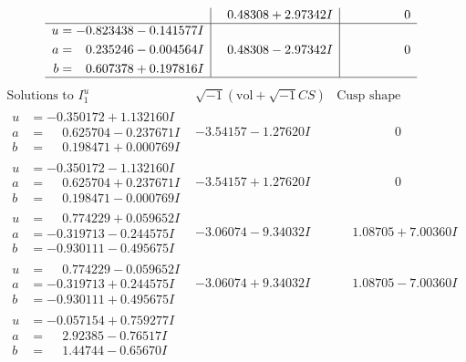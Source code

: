 \documentclass[1p]{elsarticle_modified}
\theoremstyle{definition}
\newcommand{\I}{\sqrt{-1}}
\begin{document}
$$\begin{array}{c|c|c}
 & \phantom{-}0.48308 + 2.97342 I & \phantom{-0.000000 } 0 \\ \hline\begin{aligned}
u &= -0.823438 - 0.141577 I \\
a &= \phantom{-}0.235246 - 0.004564 I \\
b &= \phantom{-}0.607378 + 0.197816 I\end{aligned}
 & \phantom{-}0.48308 - 2.97342 I & \phantom{-0.000000 } 0\\
 \hline 
 \end{array}$$\newpage$$\begin{array}{c|c|c}  
\text{Solutions to }I^u_{1}& \I (\text{vol} + \sqrt{-1}CS) & \text{Cusp shape}\\
 \hline 
\begin{aligned}
u &= -0.350172 + 1.132160 I \\
a &= \phantom{-}0.625704 - 0.237671 I \\
b &= \phantom{-}0.198471 + 0.000769 I\end{aligned}
 & -3.54157 - 1.27620 I & \phantom{-0.000000 } 0 \\ \hline\begin{aligned}
u &= -0.350172 - 1.132160 I \\
a &= \phantom{-}0.625704 + 0.237671 I \\
b &= \phantom{-}0.198471 - 0.000769 I\end{aligned}
 & -3.54157 + 1.27620 I & \phantom{-0.000000 } 0 \\ \hline\begin{aligned}
u &= \phantom{-}0.774229 + 0.059652 I \\
a &= -0.319713 - 0.244575 I \\
b &= -0.930111 - 0.495675 I\end{aligned}
 & -3.06074 - 9.34032 I & \phantom{-}1.08705 + 7.00360 I \\ \hline\begin{aligned}
u &= \phantom{-}0.774229 - 0.059652 I \\
a &= -0.319713 + 0.244575 I \\
b &= -0.930111 + 0.495675 I\end{aligned}
 & -3.06074 + 9.34032 I & \phantom{-}1.08705 - 7.00360 I \\ \hline\begin{aligned}
u &= -0.057154 + 0.759277 I \\
a &= \phantom{-}2.92385 - 0.76517 I \\
b &= \phantom{-}1.44744 - 0.65670 I\end{aligned}

\end{array}$$
\end{document}
